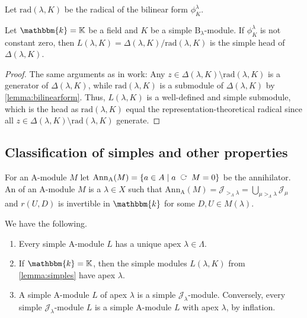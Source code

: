 \documentclass[a4paper,11pt]{amsart}
\let\emph\relax
\newcommand{\actsleft}{\mathop{\,\;\raisebox{1.7ex}{\rotatebox{-90}{$\circlearrowright$}}\;\,}}
\newcommand{\setstuff}[1]{\mathrm{#1}}
\newcommand{\K}{\mathbb{K}}
\newcommand{\KK}{\mathbbm{k}}
\numberwithin{equation}{section}
\let\fullref\autoref
\begin{document}
Let $\mathrm{rad}(\lambda,K)$ be the radical of the 
bilinear form $\phi^{\lambda}_{K}$.

\begin{lemma}\label{lemma:simples}
Let $\KK=\K$ be a field and $K$ be a simple 
$\setstuff{B}_{\lambda}$-module.
If $\phi^{\lambda}_{K}$ is not constant zero, then
$L(\lambda,K)=\Delta(\lambda,K)/\mathrm{rad}(\lambda,K)$ is 
the simple head of $\Delta(\lambda,K)$.
\end{lemma}

\begin{proof}
The same arguments as in \cite[Section 3A]{EhTu-relcell} work: 
Any $z\in\Delta(\lambda,K)\setminus\mathrm{rad}(\lambda,K)$ is a generator 
of $\Delta(\lambda,K)$, while $\mathrm{rad}(\lambda,K)$ is a submodule 
of $\Delta(\lambda,K)$ by \fullref{lemma:bilinearform}. 
Thus, $L(\lambda,K)$ is a well-defined and 
simple submodule, which is the head as $\mathrm{rad}(\lambda,K)$ equal 
the representation-theoretical radical since all 
$z\in\Delta(\lambda,K)\setminus\mathrm{rad}(\lambda,K)$ generate.
\end{proof}

\subsection{Classification of simples and other properties}\label{subsection:simples}

For an $\setstuff{A}$-module $M$ let 
$\mathrm{Ann}_{\setstuff{A}}(M)=
\{a\in A\mid a\actsleft M=0\}$ be the annihilator.
An \emph{apex} of an $\setstuff{A}$-module $M$ 
is a $\lambda\in X$ such that 
$\mathrm{Ann}_{\setstuff{A}}(M)=
\mathcal{J}_{{>_{\Lambda}}\lambda}=
\bigcup_{\mu>_{\Lambda}\lambda}\mathcal{J}_{\mu}$ 
and $r(U,D)$ is invertible in $\KK$ for some $D,U\in M(\lambda)$.

\begin{lemma}\label{lemma:apex}
We have the following.

\begin{enumerate}

\item Every simple $\setstuff{A}$-module $L$ has a unique apex 
$\lambda\in\Lambda$.

\item If $\KK=\K$, then the simple modules $L(\lambda,K)$ 
from \fullref{lemma:simples}
have apex $\lambda$.

\item A simple $\setstuff{A}$-module $L$ of apex $\lambda$ is a 
simple $\mathcal{J}_{\lambda}$-module. Conversely, 
every simple $\mathcal{J}_{\lambda}$-module $L$ is a simple 
$\setstuff{A}$-module $L$ with apex $\lambda$, by inflation.

\end{enumerate}
\end{lemma}
\end{document}
